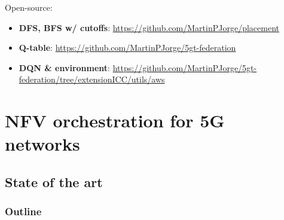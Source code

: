 \documentclass[aspectratio=169]{beamer}
\begin{document}
\begin{frame}
    \frametitle{\secname}
    \framesubtitle{\subsecname}
    Open-source:
    \begin{itemize}
        \item \textbf{DFS, BFS w/ cutoffs}: \url{https://github.com/MartinPJorge/placement}
        \item \textbf{Q-table}: \url{https://github.com/MartinPJorge/5gt-federation}
        \item \textbf{DQN \& environment}: \url{https://github.com/MartinPJorge/5gt-federation/tree/extensionICC/utils/aws}
    \end{itemize}
\end{frame}







\section{NFV orchestration for 5G networks}
\subsection{State of the art}
\begin{frame}
    \frametitle{Outline}
    \tableofcontents[subsectionstyle=show/shaded/hide,sectionstyle=show/shaded]
\end{frame}
\end{document}
